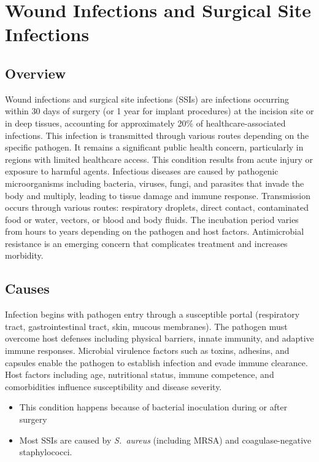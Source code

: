 \chapter{Wound Infections and Surgical Site Infections}
\label{sec:Wound Infections and Surgical Site Infections}

\section{Overview}
Wound infections and surgical site infections (SSIs) are infections occurring within 30 days of surgery (or 1 year for implant procedures) at the incision site or in deep tissues, accounting for approximately 20\% of healthcare-associated infections. This infection is transmitted through various routes depending on the specific pathogen. It remains a significant public health concern, particularly in regions with limited healthcare access. This condition results from acute injury or exposure to harmful agents. Infectious diseases are caused by pathogenic microorganisms including bacteria, viruses, fungi, and parasites that invade the body and multiply, leading to tissue damage and immune response. Transmission occurs through various routes: respiratory droplets, direct contact, contaminated food or water, vectors, or blood and body fluids. The incubation period varies from hours to years depending on the pathogen and host factors. Antimicrobial resistance is an emerging concern that complicates treatment and increases morbidity.
\section{Causes}
Infection begins with pathogen entry through a susceptible portal (respiratory tract, gastrointestinal tract, skin, mucous membranes). The pathogen must overcome host defenses including physical barriers, innate immunity, and adaptive immune responses. Microbial virulence factors such as toxins, adhesins, and capsules enable the pathogen to establish infection and evade immune clearance. Host factors including age, nutritional status, immune competence, and comorbidities influence susceptibility and disease severity.

\begin{itemize}[noitemsep]
  \item This condition happens because of bacterial inoculation during or after surgery
  \item Most SSIs are caused by \textit{S.~aureus} (including MRSA) and coagulase-negative staphylococci.
\end{itemize}
